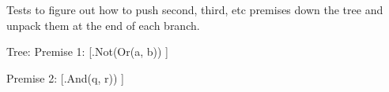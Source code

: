 \documentclass[10pt,english]{article}
\begin{document}
 
Tests to figure out how to push second, third, etc premises down the tree and unpack them at the end of each branch.


Tree:
Premise 1: [.{Not(Or(a, b))}  ]

Premise 2: [.{And(q, r))} ]

\end{document}
